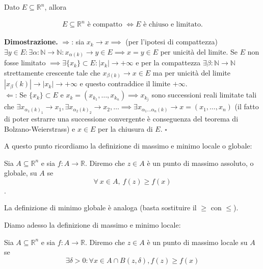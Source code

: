 \vspace{0.5cm}
\begin{theorem}[\textcolor{blue}{di Heine-Borel}]
	Dato $E \subseteq \mathbb{R}^n$, allora 
	
	\begin{align*}
		E \subseteq \mathbb{R}^n \text{ è compatto } \iff E \text{ è chiuso e limitato.}
	\end{align*}
	
	\label{thm:heine_borel}
\end{theorem}

\noindent \textbf{Dimostrazione. }
$\boxed{\Rightarrow}$: sia $x_k \to x \implies$ (per l'ipotesi di compattezza) $\exists y \in E : \exists \alpha: \mathbb{N} \to \mathbb{N} : x_{\alpha(k)} \to y \in E \implies x=y \in E$ per unicità del limite. Se $E$ non fosse limitato $\implies \exists \{x_k \} \subset E : |x_k| \to +\infty$ e per la compattezza $\exists \beta: \mathbb{N} \to \mathbb{N}$ strettamente crescente tale che $x_{\beta(k)} \to x \in E$ ma per unicità del limite $|x_\beta(k)| \to |x_k| \to +\infty$ e questo contraddice il limite $+\infty$. \\
$\boxed{\Leftarrow}$: Se $\{ x_ k\} \subset E$ e $x_k = (x_{k_1}, \ldots, x_{k_n}) \implies x_{k_j}$ sono successioni reali limitate tali che $\exists x_{{\alpha_1(k)}_1} \to x_1, \exists x_{{\alpha_2(k)}_2} \to x_2, \ldots \implies 
\exists x_{\alpha_1 \ldots \alpha_n(k)} \to x = (x_1, \ldots, x_n)$ (il fatto di poter estrarre una successione convergente è conseguenza del teorema di Bolzano-Weierstrass) e $x \in E$ per la chiusura di $E$. 
\hfill $\square$

\vspace{0.5cm}
\noindent A questo punto ricordiamo la definizione di massimo e minimo locale o globale:
\begin{definition}[\textcolor{blue}{massimo globale}]
Sia $A \subseteq \mathbb{R}^n$ e sia $f: A \to \mathbb{R}$. Diremo che $z \in A$ è un punto di massimo assoluto, o globale, su $A$ se$$\forall\ x \in A,\ f(z) \geq f(x)$$.
\end{definition}

La definizione di minimo globale è analoga (basta sostituire il $\geq$ con $\leq$). 

Diamo adesso la definizione di massimo e minimo locale:

\vspace{0.5cm}
\begin{definition}[\textcolor{blue}{massimo locale}]
Sia $A \subseteq \mathbb{R}^n$ e sia $f: A \to \mathbb{R}$. Diremo che $z \in A$ è un punto di massimo locale su $A$ se
$$
\exists \delta > 0: \forall x \in A \cap B(z, \delta), f(z) \geq f(x)
$$
\end{definition}

